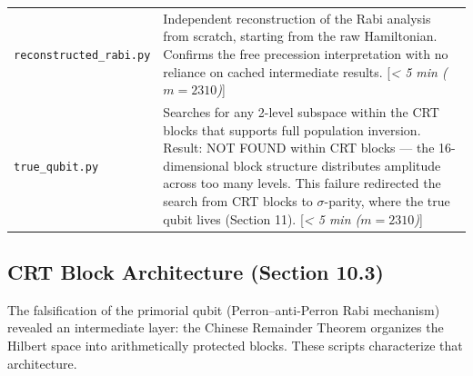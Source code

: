 \documentclass[11pt,letterpaper]{article}
\theoremstyle{definition}
\theoremstyle{remark}
\begin{document}
\begin{longtable}[]{@{}
  >{\raggedright\arraybackslash}p{}
  >{\raggedright\arraybackslash}p{}@{}}
\texttt{reconstructed\_rabi.py} & Independent reconstruction of the Rabi analysis from scratch, starting from the raw Hamiltonian. Confirms the free precession interpretation with no reliance on cached intermediate results. [\textit{\textless{} 5 min ($m = 2310$)}] \\
\texttt{true\_qubit.py} & Searches for any 2-level subspace within the CRT blocks that supports full population inversion. Result: NOT FOUND within CRT blocks --- the 16-dimensional block structure distributes amplitude across too many levels. This failure redirected the search from CRT blocks to $\sigma$-parity, where the true qubit lives (Section 11). [\textit{\textless{} 5 min ($m = 2310$)}] \\
\end{longtable}

\subsection{CRT Block Architecture (Section 10.3)}\label{crt-block-architecture-section-10.3}

The falsification of the primorial qubit (Perron--anti-Perron Rabi mechanism) revealed an intermediate layer: the Chinese Remainder Theorem organizes the Hilbert space into arithmetically protected blocks. These scripts characterize that architecture.
\end{document}
